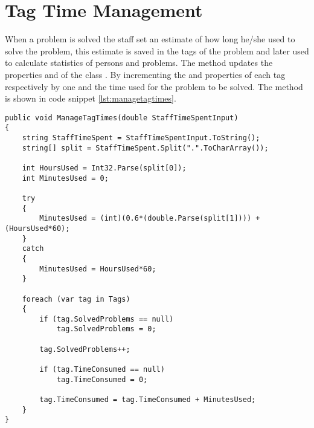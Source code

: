\section{Tag Time Management}
\label{sec:managetagtimes}


When a problem is solved the staff set an estimate of how long he/she used to solve the problem, this estimate is saved in the tags of the problem and later used to calculate statistics of persons and problems. 
The  method updates the properties  and  of the class . By incrementing the  and  properties of each tag respectively by one and the time used for the problem to be solved. The method is shown in code snippet \ref{lst:managetagtimes}.




\begin{lstlisting}[style=sourceCode, caption=\myCaption{The ManageTagTimes method}, label=lst:managetagtimes]
public void ManageTagTimes(double StaffTimeSpentInput)
{
    string StaffTimeSpent = StaffTimeSpentInput.ToString();
    string[] split = StaffTimeSpent.Split(".".ToCharArray());
    
    int HoursUsed = Int32.Parse(split[0]);
    int MinutesUsed = 0;

    try
    {
        MinutesUsed = (int)(0.6*(double.Parse(split[1]))) + (HoursUsed*60);
    }
    catch
    {
        MinutesUsed = HoursUsed*60;
    }

    foreach (var tag in Tags)
    {
        if (tag.SolvedProblems == null)
            tag.SolvedProblems = 0;
        
        tag.SolvedProblems++;

        if (tag.TimeConsumed == null)
            tag.TimeConsumed = 0;

        tag.TimeConsumed = tag.TimeConsumed + MinutesUsed;
    }
}
\end{lstlisting}